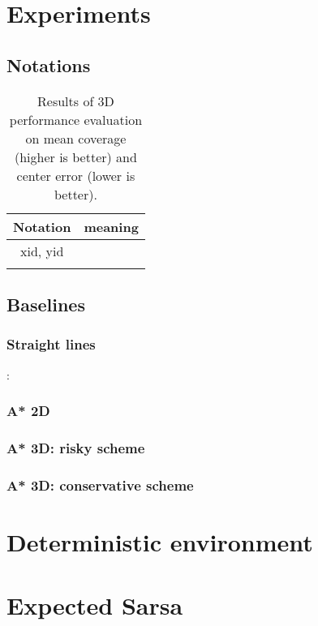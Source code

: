 \documentclass{article}
\begin{document}
\section{Experiments}
\subsection{Notations}
\begin{table}[t]
\small
   \centering
        \begin{tabu}{@{}cc@{}}\toprule
        [-1pt] 
        Notation                       &   meaning        \\
        \hline
        xid, yid   & \\
        [-1pt] 
        \end{tabu}

    \caption{ {\small
    Results of 3D performance evaluation on mean coverage (higher is better) and center error (lower is better).
     }
          } \label{table_baseline_3d}
\end{table}

\subsection{Baselines}
\subsubsection{Straight lines}:
\subsubsection{A* 2D}
\subsubsection{A* 3D: risky scheme}
\subsubsection{A* 3D: conservative scheme}

\section{Deterministic environment}

\section{Expected Sarsa}
\end{document}
